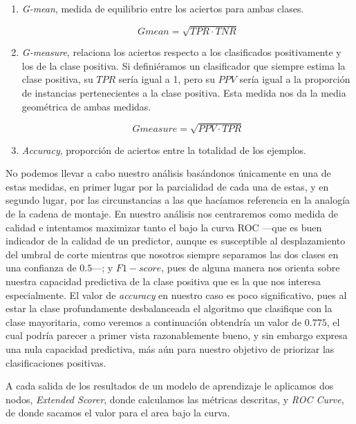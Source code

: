 \documentclass{article}
\newcommand{\img}[2]{
\noindent\makebox[\textwidth][c]{\texttt{[image: \#1]}}%
}
\begin{document}
\begin{enumerate}
\item \textit{G-mean}, medida de equilibrio entre los aciertos para ambas clases.

\[ Gmean = \sqrt{TPR\cdot TNR} \]

\item \textit{G-measure}, relaciona los aciertos respecto a los clasificados positivamente y los de la clase positiva. Si definiéramos un clasificador que siempre estima la clase positiva, su $TPR$ sería igual a 1, pero su $PPV$ sería igual a la proporción de instancias pertenecientes a la clase positiva. Esta medida nos da la media geométrica de ambas medidas.

\[ Gmeasure = \sqrt{PPV\cdot TPR} \]

\item \textit{Accuracy}, proporción de aciertos entre la totalidad de los ejemplos.

\end{enumerate}

No podemos llevar a cabo nuestro análisis basándonos únicamente en una de estas medidas, en primer lugar por la parcialidad de cada una de estas, y en segundo lugar, por las circunstancias a las que hacíamos referencia en la analogía de la cadena de montaje. En nuestro análisis nos centraremos como medida de calidad e intentamos maximizar tanto el  bajo la curva ROC ---que es buen indicador de la calidad de un predictor, aunque es susceptible al desplazamiento del umbral de corte mientras que nosotros siempre separamos las dos clases en una confianza de $0.5$---; y $F1-score$, pues de alguna manera nos orienta sobre nuestra capacidad predictiva de la clase positiva que es la que nos interesa especialmente. El valor de \textit{accuracy} en nuestro caso es poco significativo, pues al estar la clase profundamente desbalanceada el algoritmo que clasifique con la clase mayoritaria, como veremos a continuación obtendría un valor de $0.775$, el cual podría parecer a primer vista razonablemente bueno, y sin embargo expresa una nula capacidad predictiva, más aún para nuestro objetivo de priorizar las clasificaciones positivas.

A cada salida de los resultados de un modelo de aprendizaje le aplicamos dos nodos, \textit{Extended Scorer}, donde calculamos las métricas descritas, y \textit{ROC Curve}, de donde sacamos el valor para el area bajo la curva.

\img{measure1}{0.7}
\\

\img{measure2}{0.7}
\end{document}
